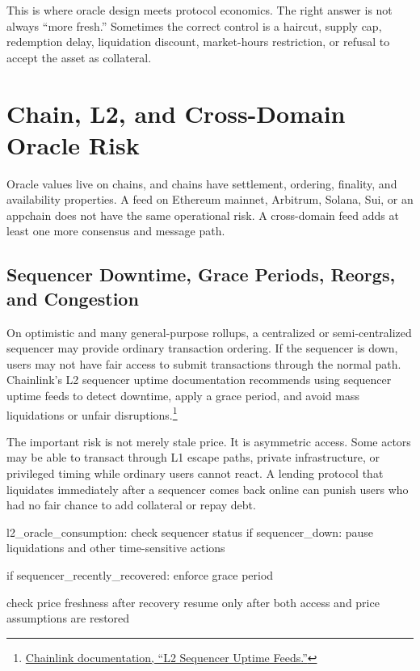 This is where oracle design meets protocol economics. The right answer is not always ``more fresh.'' Sometimes the correct control is a haircut, supply cap, redemption delay, liquidation discount, market-hours restriction, or refusal to accept the asset as collateral.

\section{Chain, L2, and Cross-Domain Oracle Risk}

Oracle values live on chains, and chains have settlement, ordering, finality, and availability properties. A feed on Ethereum mainnet, Arbitrum, Solana, Sui, or an appchain does not have the same operational risk. A cross-domain feed adds at least one more consensus and message path.

\subsection{Sequencer Downtime, Grace Periods, Reorgs, and Congestion}

On optimistic and many general-purpose rollups, a centralized or semi-centralized sequencer may provide ordinary transaction ordering. If the sequencer is down, users may not have fair access to submit transactions through the normal path. Chainlink's L2 sequencer uptime documentation recommends using sequencer uptime feeds to detect downtime, apply a grace period, and avoid mass liquidations or unfair disruptions.\footnote{\href{https://docs.chain.link/data-feeds/l2-sequencer-feeds}{Chainlink documentation, ``L2 Sequencer Uptime Feeds.''}}

The important risk is not merely stale price. It is asymmetric access. Some actors may be able to transact through L1 escape paths, private infrastructure, or privileged timing while ordinary users cannot react. A lending protocol that liquidates immediately after a sequencer comes back online can punish users who had no fair chance to add collateral or repay debt.

\begin{codeblock}
l2_oracle_consumption:
    check sequencer status
    if sequencer_down:
        pause liquidations and other time-sensitive actions

    if sequencer_recently_recovered:
        enforce grace period

    check price freshness after recovery
    resume only after both access and price assumptions are restored
\end{codeblock}

